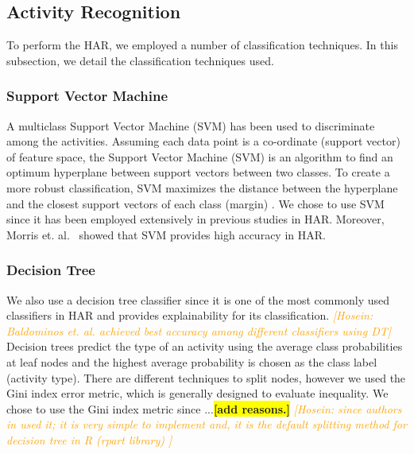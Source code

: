 \documentclass[journal,article,submit,moreauthors,pdftex]{Definitions/mdpi}
\newcommand{\hosein}[1]{\textcolor{orange}{{\it [Hosein: #1]}}}
\newcommand{\todo}[1]{\colorbox{yellow}{\textbf{[#1]}}}
\begin{document}
\subsection{Activity Recognition}
To perform the HAR, we employed a number of classification techniques. In this subsection, we detail the classification techniques used.

\subsubsection{Support Vector Machine}
A multiclass Support Vector Machine (SVM) has been used to discriminate among the activities. Assuming each data point is a co-ordinate (support vector) of feature space, the Support Vector Machine (SVM) is an algorithm to find an optimum hyperplane between support vectors between two classes. To create a more robust classification, SVM maximizes the distance between the hyperplane and the closest support vectors of each class (margin) \cite{zhang2012physical}. We chose to use SVM since it has been employed extensively in previous studies in HAR. Moreover, Morris et. al.~\cite{morris2014recofit,rosati2018comparison} showed that SVM provides high accuracy in HAR.



\subsubsection{Decision Tree}

We also use a decision tree classifier since it is one of the most commonly used classifiers in HAR \cite{mortazavi2014determining, baldominos2019comparison} and provides explainability for its classification. \hosein{Baldominos et. al. \cite{baldominos2019comparison} achieved best accuracy among different classifiers using DT} Decision trees predict the type of an activity using the average class probabilities at leaf nodes and the highest average probability is chosen as the class label (activity type). There are different techniques to split nodes, however we used the Gini index error metric, which is generally designed to evaluate inequality. We chose to use the Gini index metric since ...\todo{add reasons.} \hosein{since authors in \cite{rosati2018comparison, masum2018human}used it; it is very simple to implement and, it is the default splitting method for decision tree in R (rpart library) }
\end{document}
